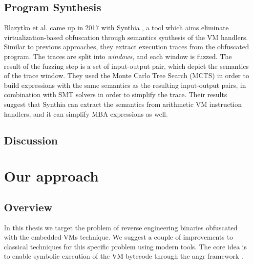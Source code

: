 \section{Program Synthesis}

Blazytko et al. came up in 2017 with Synthia \cite{blazytko2017}, a tool which aims eliminate virtualization-based obfuscation through semantics synthesis of the \gls{VM} handlers. Similar to previous approaches, they extract execution traces from the obfuscated program. The traces are split into \emph{windows}, and each window is fuzzed. The result of the fuzzing step is a set of input-output pair, which depict the semantics of the trace window. They used the Monte Carlo Tree Search (MCTS) in order to build expressions with the same semantics as the resulting input-output pairs, in combination with SMT solvers in order to simplify the trace. Their results suggest that Synthia can extract the semantics from arithmetic \gls{VM} instruction handlers, and it can simplify \gls{MBA} expressions as well.


\section{Discussion}




\chapter{Our approach}

\section{Overview}

In this thesis we target the problem of reverse engineering binaries obfuscated with the embedded \glspl{VM} technique. We suggest a couple of improvements to classical techniques for this specific problem using modern tools. The core idea is to enable symbolic execution of the VM bytecode through the angr framework \cite{angr}. 

